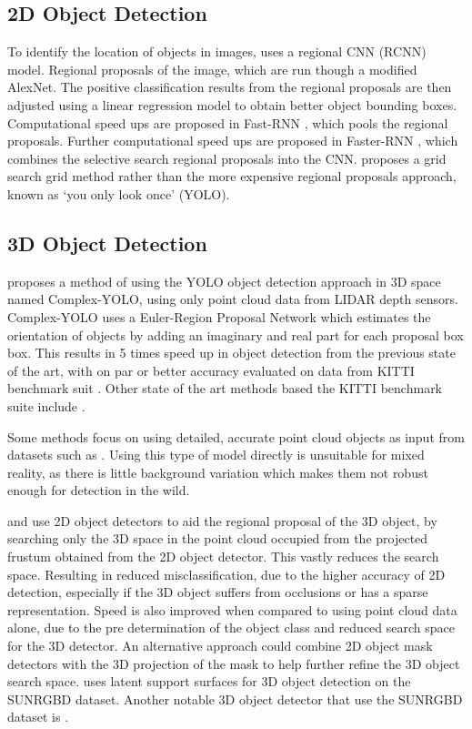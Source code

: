 \documentclass[11pt]{article}
\begin{document}
\subsection*{2D Object Detection}
To identify the location of objects in images, \cite{RNN} uses a regional CNN (RCNN) model. Regional proposals of the image, which are run though a modified AlexNet. The positive classification results from the regional proposals are then adjusted using a linear regression model to obtain better object bounding boxes. Computational speed ups are proposed in Fast-RNN \cite{fast_RNN}, which pools the regional proposals. Further computational speed ups are proposed in Faster-RNN \cite{faster_RNN}, which combines the selective search regional proposals into the CNN. \cite{YOLO} proposes a grid search grid method rather than the more expensive regional proposals approach, known as `you only look once' (YOLO).

\subsection*{3D Object Detection}
\cite{complex_YOLO} proposes a method of using the YOLO object detection approach in 3D space named Complex-YOLO, using only point cloud data from LIDAR depth sensors. Complex-YOLO uses a Euler-Region Proposal Network which estimates the orientation of objects by adding an imaginary and real part for each proposal box box. This results in 5 times speed up in object detection from the previous state of the art, with on par or better accuracy evaluated on data from KITTI benchmark suit \cite{KITTI}. Other state of the art methods based the KITTI benchmark suite include \cite{point_fusion}\cite{multi_fusion}\cite{fast_furious}\cite{VoxelNet}. 

Some methods focus on using detailed, accurate point cloud objects as input \cite{subgroup_voting}\cite{pose_RGBD}\cite{real_time_single} from datasets such as \cite{3D_dataset}. Using this type of model directly is unsuitable for mixed reality, as there is little background variation which makes them not robust enough for detection in the wild. 

\cite{PointNets} and \cite{frustum} use 2D object detectors to aid the regional proposal of the 3D object, by searching only the 3D space in the point cloud occupied from the projected frustum obtained from the 2D object detector. This vastly reduces the search space. Resulting in reduced misclassification, due to the higher accuracy of 2D detection, especially if the 3D object suffers from occlusions or has a sparse representation. Speed is also improved when compared to using point cloud data alone, due to the pre determination of the object class and reduced search space for the 3D detector. An alternative approach could combine 2D object mask detectors\cite{first_person_mask}\cite{mask_RCNN} with the 3D projection of the mask to help further refine the 3D object search space. \cite{latent_surface} uses latent support surfaces for 3D object detection on the SUNRGBD dataset. Another notable 3D object detector that use the SUNRGBD dataset is \cite{SnapNet}. 
\end{document}

